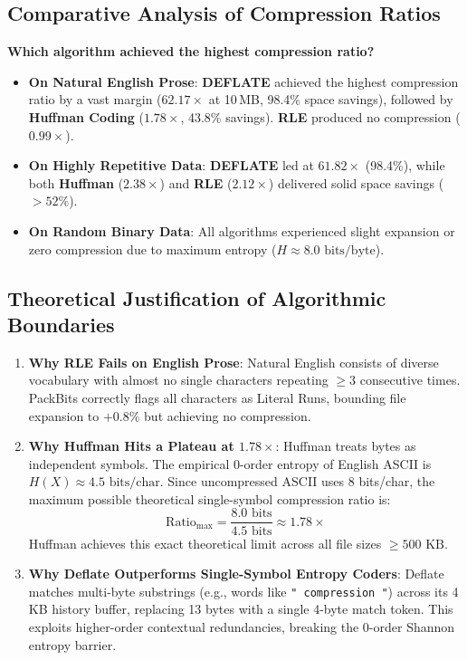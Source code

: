 \documentclass[12pt,a4paper]{article}
\begin{document}
\subsection{Comparative Analysis of Compression Ratios}
\textbf{Which algorithm achieved the highest compression ratio?}
\begin{itemize}
    \item \textbf{On Natural English Prose}: \textbf{DEFLATE} achieved the highest compression ratio by a vast margin ($\mathbf{62.17\times}$ at 10\,MB, 98.4\% space savings), followed by \textbf{Huffman Coding} ($1.78\times$, 43.8\% savings). \textbf{RLE} produced no compression ($0.99\times$).
    \item \textbf{On Highly Repetitive Data}: \textbf{DEFLATE} led at $\mathbf{61.82\times}$ (98.4\%), while both \textbf{Huffman} ($2.38\times$) and \textbf{RLE} ($2.12\times$) delivered solid space savings ($> 52\%$).
    \item \textbf{On Random Binary Data}: All algorithms experienced slight expansion or zero compression due to maximum entropy ($H \approx 8.0\text{ bits/byte}$).
\end{itemize}

\subsection{Theoretical Justification of Algorithmic Boundaries}
\begin{enumerate}
    \item \textbf{Why RLE Fails on English Prose}: Natural English consists of diverse vocabulary with almost no single characters repeating $\ge 3$ consecutive times. PackBits correctly flags all characters as Literal Runs, bounding file expansion to $+0.8\%$ but achieving no compression.
    \item \textbf{Why Huffman Hits a Plateau at $1.78\times$}: Huffman treats bytes as independent symbols. The empirical 0-order entropy of English ASCII is $H(X) \approx 4.5\text{ bits/char}$. Since uncompressed ASCII uses 8 bits/char, the maximum possible theoretical single-symbol compression ratio is:
    \begin{equation}
    \text{Ratio}_{\max} = \frac{8.0\text{ bits}}{4.5\text{ bits}} \approx \mathbf{1.78\times}
    \end{equation}
    Huffman achieves this exact theoretical limit across all file sizes $\ge 500\text{ KB}$.
    \item \textbf{Why Deflate Outperforms Single-Symbol Entropy Coders}: Deflate matches multi-byte substrings (e.g., words like \texttt{" compression "}) across its 4\,KB history buffer, replacing 13 bytes with a single 4-byte match token. This exploits higher-order contextual redundancies, breaking the 0-order Shannon entropy barrier.
\end{enumerate}
\end{document}
